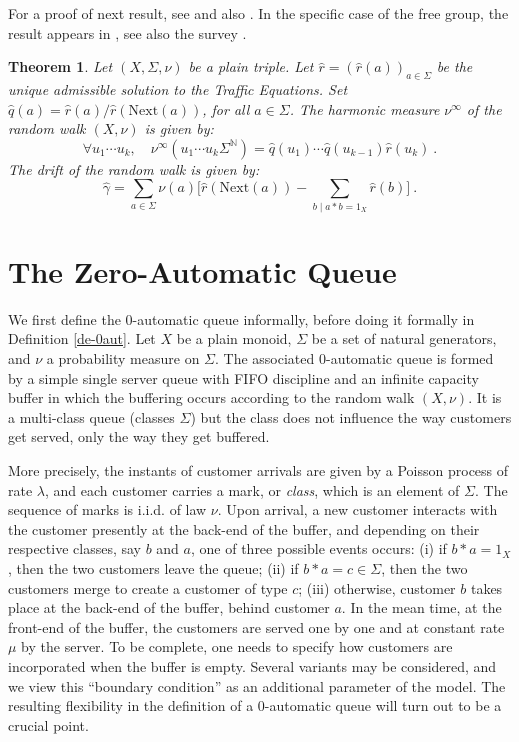 \documentclass[11pt,a4paper]{article}
\newtheorem{theorem}{Theorem}[section]
\theoremstyle{remark}
\def\Blackboardfont{\mathbb}
\def\rig{\text{Next}}
\def\N{{\Blackboardfont N}}
\begin{document}
For a proof of next result, see \cite[Theorem 4.5]{mair04} and also
\cite[Theorem 3.3]{MaMa}. In
the specific case of the free group, the result appears in
\cite{DyMa,SaSt}, see also the survey \cite{ledr00}.

\begin{theorem}\label{th-rw}
Let $(X,\Sigma,\nu)$ be a plain triple. Let
$\widehat{r}=(\widehat{r}(a))_{a\in \Sigma}$ be the unique
  admissible solution to the Traffic Equations.
Set $\widehat{q}(a)= \widehat{r}(a)/\widehat{r}(\rig(a))$, for all
$a\in \Sigma$. The harmonic measure $\nu^{\infty}$ of the random
walk $(X,\nu)$ is given by:
\begin{equation}
\forall u_1\cdots u_k, \quad \nu^{\infty}(u_1 \cdots u_k\Sigma^{\N})
= \widehat{q}(u_1) \cdots \widehat{q}(u_{k-1}) \widehat{r}(u_k)\:.
\end{equation}
The drift of the random walk is given by:
\begin{equation}\label{eq-drift}
\widehat{\gamma} = \sum_{a\in \Sigma} \nu(a) \bigl[ \widehat{r}(\rig(a))  -
  \sum_{b \mid a\ast b =1_X} \widehat{r}(b) \bigr]\:.
\end{equation}
\end{theorem}

\section{The Zero-Automatic Queue}\label{se-0autq}

We first define the 0-automatic queue informally, before doing it
formally in Definition \ref{de-0aut}. 
Let $X$ be a plain monoid, $\Sigma$ be a set of natural
generators, and $\nu$ a probability measure on $\Sigma$. 
The associated
0-automatic queue is formed by a simple single server queue with
FIFO discipline and an infinite capacity buffer in which the
buffering occurs according to the random walk $(X,\nu)$. It is a
multi-class queue (classes $\Sigma$) but the class does not
influence the way customers get served, only the way they get
buffered.

\medskip

More precisely, the instants of customer arrivals are given by a
Poisson process of rate $\lambda$, and each customer carries a
mark, or {\em class}, which is an element of $\Sigma$. The
sequence of marks is i.i.d. of law $\nu$. Upon arrival, a new
customer interacts with the customer presently at the back-end of
the buffer, and depending on their respective classes, say $b$ and
$a$, one of three possible events occurs: (i) if $b\ast a =1_X$,
then the two customers leave the queue; (ii) if $b\ast a=c\in
\Sigma$, then the two customers merge to create a customer of type
$c$; (iii) otherwise, customer $b$ takes place at the back-end of
the buffer, behind customer $a$. In the mean time, at the
front-end of the buffer, the customers are served one by one and
at constant rate $\mu$ by the server. To be complete, one needs to
specify how customers are incorporated when the buffer is empty.
Several variants may be considered, and we view this ``boundary
condition'' as an additional parameter of the model.
The resulting flexibility in the definition of a 0-automatic queue
will turn out to be a crucial point.
\end{document}

